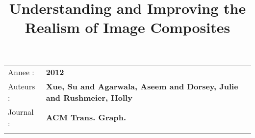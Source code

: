 \documentclass[10pt]{article}
\begin{document}
\title{Understanding and Improving the Realism of Image Composites}
\maketitle

\begin{longtable}[c]{@{}ll@{}}
\toprule\addlinespace

Annee : & \textbf{2012}
\\\addlinespace

Auteurs : & \textbf{Xue, Su and Agarwala, Aseem and Dorsey, Julie and Rushmeier, Holly}
\\\addlinespace

Journal : & \textbf{ACM Trans. Graph.}
\\\addlinespace

\bottomrule
\end{longtable}
\end{document}
